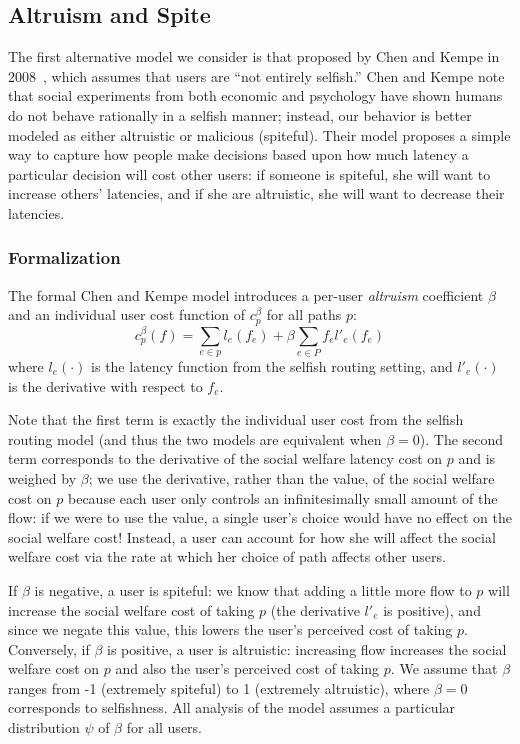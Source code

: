 \subsection{Altruism and Spite}
The first alternative model we consider is that proposed by Chen and Kempe in 2008~\cite{chen}, which assumes that users are ``not entirely selfish.''
Chen and Kempe note that social experiments from both economic and psychology have shown humans do not behave rationally in a selfish manner; instead, our behavior is better modeled as either altruistic or malicious (spiteful).
Their model proposes a simple way to capture how people make decisions based upon how much latency a particular decision will cost other users: if someone is spiteful, she will want to increase others' latencies, and if she are altruistic, she will want to decrease their latencies.

\subsubsection{Formalization}
The formal Chen and Kempe model introduces a per-user \emph{altruism} coefficient $\beta$ and an individual user cost function
of $c^\beta_p$ for all paths $p$:
$$c^\beta_p(f) = \sum_{e \in p} l_e(f_e) + \beta\sum_{e\in P} f_el'_e(f_e)$$
where $l_e(\cdot)$ is the latency function from the selfish routing setting, and $l'_e(\cdot)$ is the derivative with respect to $f_e$.

Note that the first term is exactly the individual user cost from the selfish routing model (and thus the two models are equivalent when $\beta = 0$).
The second term corresponds to the derivative of the social welfare latency cost on $p$ and is weighed by $\beta$; we use the derivative, rather than the value, of the social welfare cost on $p$ because each user only controls an infinitesimally small amount of the flow: if we were to use the value, a single user's choice would have no effect on the social welfare cost! 
Instead, a user can account for how she will affect the social welfare cost via the rate at which her choice of path affects other users.

If $\beta$ is negative, a user is spiteful: we know that adding a little more flow to $p$ will increase the social welfare cost of taking $p$ (the derivative $l'_e$ is positive), and since we negate this value, this lowers the user's perceived cost of taking $p$.
Conversely, if $\beta$ is positive, a user is altruistic: increasing flow increases the social welfare cost on $p$ and also the user's perceived cost of taking $p$.
We assume that $\beta$ ranges from -1 (extremely spiteful) to 1 (extremely altruistic), where $\beta=0$ corresponds to selfishness.
All analysis of the model assumes a particular distribution $\psi$ of $\beta$ for all users. 

